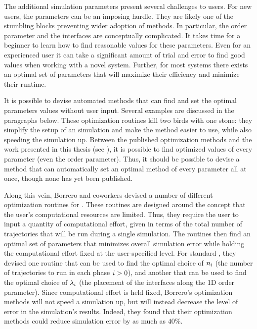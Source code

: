 The additional simulation parameters present several challenges to users. For new users, the  parameters can be an imposing hurdle. They are likely one of the stumbling blocks preventing wider adoption of  methods. In particular, the order parameter and the interfaces are conceptually complicated. It takes time for a beginner to learn how to find reasonable values for these parameters. Even for an experienced user it can take a significant amount of trial and error\supercite{Kratzer:2013fs} to find good values when working with a novel system. Further, for most systems there exists an optimal\supercite{Ma:2005jh} set of  parameters that will maximize their efficiency and minimize their runtime.

It is possible to devise automated methods that can find and set the optimal  parameters values without user input. Several examples are discussed in the paragraphs below. These optimization routines kill two birds with one stone: they simplify the setup of an  simulation and make the method easier to use, while also speeding the simulation up. Between the published optimization methods and the work presented in this thesis (see ), it is possible to find optimized values of every  parameter (even the order parameter\supercite{Borrero:2007eq}). Thus, it should be possible to devise a method that can automatically set an optimal method of every parameter all at once, though none has yet been published.%

Along this vein, Borrero and coworkers devised a number of different optimization routines\supercite{Borrero:2008il} for . These routines are designed around the concept that the user's computational resources are limited. Thus, they require the user to input a quantity of computational effort, given in terms of the total number of trajectories that will be run during a single  simulation. The routines then find an optimal set of parameters that minimizes overall simulation error while holding the computational effort fixed at the user-specified level. For standard , they devised one routine that can be used to find the optimal choice of $n_{i}$ (the number of trajectories to run in each phase $i>0$), and another that can be used to find the optimal choice of ${\lambda}_{i}$ (the placement of the interfaces along the 1D order parameter). Since computational effort is held fixed, Borrero's optimization methods will not speed a simulation up, but will instead decrease the level of error in the simulation's results. Indeed, they found that their optimization methods could reduce simulation error by as much as $40\%$.

